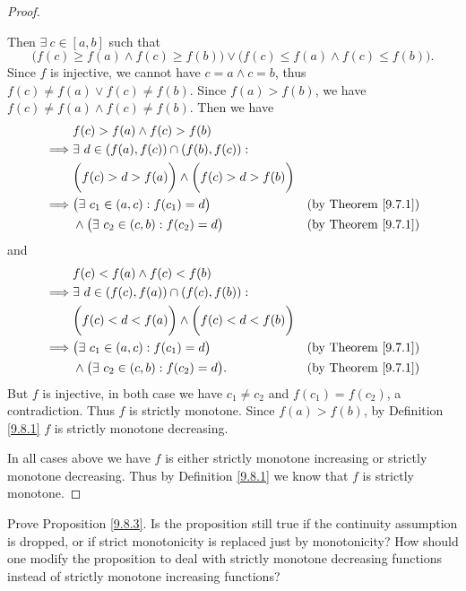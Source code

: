 \begin{proof}
\begin{enumerate}
        Then \(\exists\ c \in [a, b]\) such that
        \[
            \bigg(f(c) \geq f(a) \land f(c) \geq f(b)\bigg) \lor \bigg(f(c) \leq f(a) \land f(c) \leq f(b)\bigg).
        \]
        Since \(f\) is injective, we cannot have \(c = a \land c = b\), thus \(f(c) \neq f(a) \lor f(c) \neq f(b)\).
        Since \(f(a) > f(b)\), we have \(f(c) \neq f(a) \land f(c) \neq f(b)\).
        Then we have
        \begin{align*}
            & f(c) > f(a) \land f(c) > f(b) \\
            \implies & \exists\ d \in (f(a), f(c)) \cap (f(b), f(c)) : \\
            & \bigg(f(c) > d > f(a)\bigg) \land \bigg(f(c) > d > f(b)\bigg) \\
            \implies & \big(\exists\ c_1 \in (a, c) : f(c_1) = d\big) & \text{(by Theorem \ref{9.7.1})} \\
            & \land \big(\exists\ c_2 \in (c, b) : f(c_2) = d\big) & \text{(by Theorem \ref{9.7.1})} \\
        \end{align*}
        and
        \begin{align*}
            & f(c) < f(a) \land f(c) < f(b) \\
            \implies & \exists\ d \in (f(c), f(a)) \cap (f(c), f(b)) : \\
            & \bigg(f(c) < d < f(a)\bigg) \land \bigg(f(c) < d < f(b)\bigg) \\
            \implies & \big(\exists\ c_1 \in (a, c) : f(c_1) = d\big) & \text{(by Theorem \ref{9.7.1})} \\
            & \land \big(\exists\ c_2 \in (c, b) : f(c_2) = d\big). & \text{(by Theorem \ref{9.7.1})} \\
        \end{align*}
        But \(f\) is injective, in both case we have \(c_1 \neq c_2\) and \(f(c_1) = f(c_2)\), a contradiction.
        Thus \(f\) is strictly monotone.
        Since \(f(a) > f(b)\), by Definition \ref{9.8.1} \(f\) is strictly monotone decreasing.
    \end{enumerate}
    In all cases above we have \(f\) is either strictly monotone increasing or strictly monotone decreasing.
    Thus by Definition \ref{9.8.1} we know that \(f\) is strictly monotone.
\end{proof}

\begin{exercise}\label{ex 9.8.4}
    Prove Proposition \ref{9.8.3}.
    Is the proposition still true if the continuity assumption is dropped, or if strict monotonicity is replaced just by monotonicity?
    How should one modify the proposition to deal with strictly monotone decreasing functions instead of strictly monotone increasing functions?
\end{exercise}

